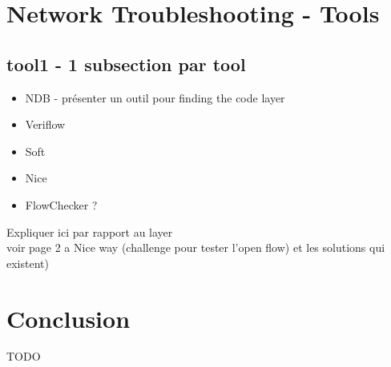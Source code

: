 \documentclass[10pt,article]{IEEEtran}
\begin{document}
\section{Network Troubleshooting - Tools}

\subsection{tool1 - 1 subsection par tool}
\begin{itemize}
\item NDB - présenter un outil pour finding the code layer
\item Veriflow
\item Soft
\item Nice
\item FlowChecker ?
\end{itemize}
Expliquer ici par rapport au layer\\

voir page 2 a Nice way (challenge pour tester l'open flow) et les solutions qui existent)


\section{Conclusion}
TODO



\end{document}
